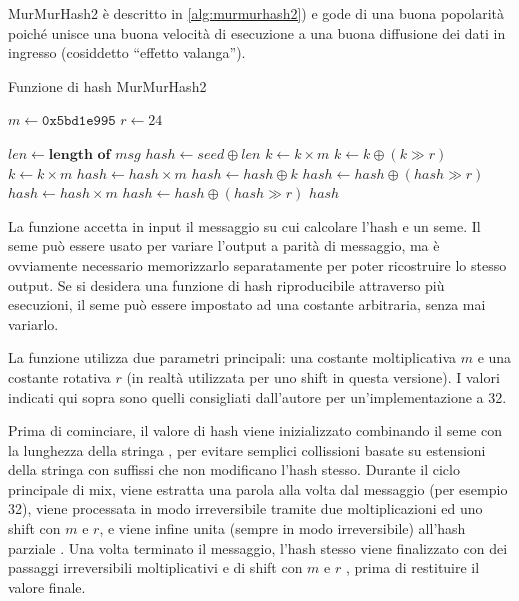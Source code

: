 MurMurHash2 è descritto in \autoref{alg:murmurhash2}) e gode di una buona popolarità poiché unisce
una buona velocità di esecuzione a una buona diffusione dei dati in ingresso (cosiddetto ``effetto
valanga'').

\begin{algorithm}
\caption{Funzione di hash MurMurHash2}
\label{alg:murmurhash2}
\begin{algorithmic}
	\State \lnote[2em]$m \gets \mathtt{0x5bd1e995}$ 
	\State \lnote[2em]$r \gets 24$ 

	\State $len \gets \textbf{length of}$ $msg$
	\State \lnote[2em]$hash \gets seed \oplus len$
	 
		\State \lnote[38pt]$k \gets k \times m$
		\State $k \gets k \oplus (k \gg r)$
		\State $k \gets k \times m$
		\State $hash \gets hash \times m$
		\State \lnote[38pt]$hash \gets hash \oplus k$
	\EndFor
	\State \lnote[2em]$hash \gets hash \oplus (hash \gg r)$ 
	\State $hash \gets hash \times m$
	\State $hash \gets hash \oplus (hash \gg r)$
	\State \Return $hash$
\EndProcedure
\end{algorithmic}
\end{algorithm}

La funzione accetta in input il messaggio su cui calcolare l'hash e un seme. Il seme può essere
usato per variare l'output a parità di messaggio, ma è ovviamente necessario memorizzarlo
separatamente per poter ricostruire lo stesso output. Se si desidera una funzione di hash
riproducibile attraverso più esecuzioni, il seme può essere impostato ad una costante arbitraria,
senza mai variarlo.

La funzione utilizza due parametri principali: una costante moltiplicativa $m$  e una
costante rotativa $r$  (in realtà utilizzata per uno shift in questa versione). I valori
indicati qui sopra sono quelli consigliati dall'autore per un'implementazione a \SI{32}{\bit}.

Prima di cominciare, il valore di hash viene inizializzato combinando il seme con la lunghezza della
stringa , per evitare semplici collissioni basate su estensioni della stringa con suffissi
che non modificano l'hash stesso. Durante il ciclo principale di mix, viene estratta una parola alla
volta dal messaggio (per esempio \SI{32}{\bit}), viene processata in modo irreversibile tramite due
moltiplicazioni ed uno shift con $m$ e $r$, e viene infine unita (sempre in modo irreversibile)
all'hash parziale . Una volta terminato il messaggio, l'hash stesso viene finalizzato con
dei passaggi irreversibili moltiplicativi e di shift con $m$ e $r$ , prima di restituire il
valore finale.

